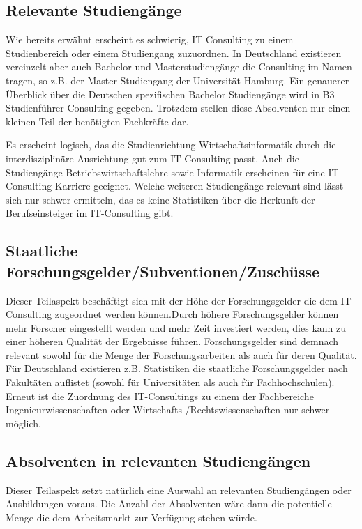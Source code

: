 \subsection{ Relevante Studiengänge}
Wie bereits erwähnt erscheint es schwierig, IT Consulting zu einem Studienbereich oder einem Studiengang zuzuordnen. 
In Deutschland existieren vereinzelt aber auch Bachelor und Masterstudiengänge die Consulting im Namen tragen, so z.B. der Master Studiengang der Universität Hamburg. Ein genauerer Überblick über die Deutschen spezifischen Bachelor Studiengänge wird in B3 Studienführer Consulting gegeben. Trotzdem stellen diese Absolventen nur einen kleinen Teil der benötigten Fachkräfte dar. 

Es erscheint logisch, das die Studienrichtung Wirtschaftsinformatik durch die interdisziplinäre Ausrichtung gut zum IT-Consulting passt. Auch die Studiengänge Betriebswirtschaftslehre sowie Informatik erscheinen für eine IT Consulting Karriere geeignet. Welche weiteren Studiengänge relevant sind lässt sich nur schwer ermitteln, das es keine Statistiken über die Herkunft der Berufseinsteiger im IT-Consulting gibt.

\subsection{ Staatliche Forschungsgelder/Subventionen/Zuschüsse}
Dieser Teilaspekt beschäftigt sich mit der Höhe der Forschungsgelder die dem IT-Consulting zugeordnet werden können.Durch höhere Forschungsgelder können mehr Forscher eingestellt werden und mehr Zeit investiert werden, dies kann zu einer höheren Qualität der Ergebnisse führen. Forschungsgelder sind demnach relevant sowohl für die Menge der Forschungsarbeiten als auch für deren Qualität.
Für Deutschland existieren z.B. Statistiken die staatliche Forschungsgelder nach Fakultäten auflistet (sowohl für Universitäten als auch für Fachhochschulen). Erneut ist die Zuordnung des IT-Consultings zu einem der Fachbereiche Ingenieurwissenschaften oder Wirtschafts-/Rechtswissenschaften nur schwer möglich.

\subsection{ Absolventen in relevanten Studiengängen}
Dieser Teilaspekt setzt natürlich eine Auswahl an relevanten Studiengängen oder Ausbildungen voraus. Die Anzahl der Absolventen wäre dann die potentielle Menge die dem Arbeitsmarkt zur Verfügung stehen würde. 


